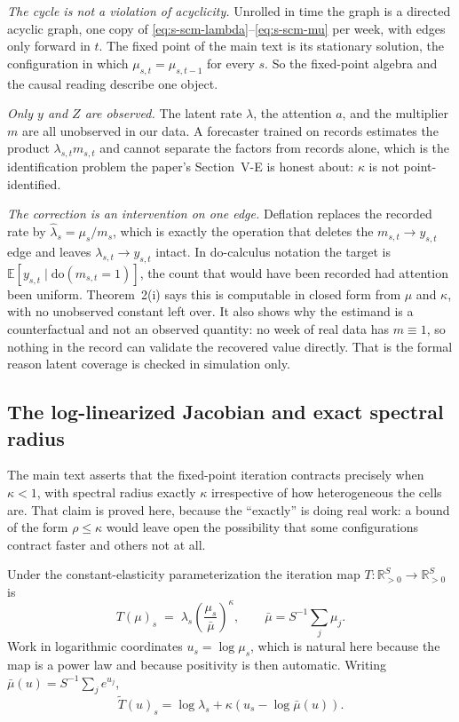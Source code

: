 \documentclass[journal,10pt,onecolumn]{IEEEtran}
\begin{document}
\emph{The cycle is not a violation of acyclicity.} Unrolled in time the graph is a
directed acyclic graph, one copy of \eqref{eq:s-scm-lambda}--\eqref{eq:s-scm-mu}
per week, with edges only forward in $t$. The fixed point of the main text is its
stationary solution, the configuration in which $\mu_{s,t} = \mu_{s,t-1}$ for
every $s$. So the fixed-point algebra and the causal reading describe one object.

\emph{Only $y$ and $Z$ are observed.} The latent rate $\lambda$, the attention
$a$, and the multiplier $m$ are all unobserved in our data. A forecaster trained
on records estimates the product $\lambda_{s,t} m_{s,t}$ and cannot separate the
factors from records alone, which is the identification problem the paper's
Section~V-E is honest about: $\kappa$ is not point-identified.

\emph{The correction is an intervention on one edge.} Deflation replaces the
recorded rate by $\hat{\lambda}_s = \mu_s / m_s$, which is exactly the operation
that deletes the $m_{s,t} \rightarrow y_{s,t}$ edge and leaves
$\lambda_{s,t} \rightarrow y_{s,t}$ intact. In do-calculus notation the target is
$\mathbb{E}[y_{s,t} \mid \mathrm{do}(m_{s,t} = 1)]$, the count that would have been
recorded had attention been uniform. Theorem~2(i) says this is computable in closed
form from $\mu$ and $\kappa$, with no unobserved constant left over. It also shows
why the estimand is a counterfactual and not an observed quantity: no week of real
data has $m \equiv 1$, so nothing in the record can validate the recovered value
directly. That is the formal reason latent coverage is checked in simulation only.

\subsection{The log-linearized Jacobian and exact spectral radius}
\label{sec:s1-jacobian}

The main text asserts that the fixed-point iteration contracts precisely when
$\kappa < 1$, with spectral radius exactly $\kappa$ irrespective of how
heterogeneous the cells are. That claim is proved here, because the ``exactly''
is doing real work: a bound of the form $\rho \le \kappa$ would leave open the
possibility that some configurations contract faster and others not at all.

Under the constant-elasticity parameterization the iteration map
$T : \mathbb{R}^S_{>0} \to \mathbb{R}^S_{>0}$ is
\begin{equation}
\label{eq:s-map}
T(\mu)_s \;=\; \lambda_s \left(\frac{\mu_s}{\bar{\mu}}\right)^{\!\kappa},
\qquad \bar{\mu} = S^{-1}\textstyle\sum_j \mu_j .
\end{equation}
Work in logarithmic coordinates $u_s = \log \mu_s$, which is natural here because
the map is a power law and because positivity is then automatic. Writing
$\bar{\mu}(u) = S^{-1}\sum_j e^{u_j}$,
\begin{equation}
\label{eq:s-logmap}
\widetilde{T}(u)_s = \log \lambda_s + \kappa\left(u_s - \log \bar{\mu}(u)\right).
\end{equation}
\end{document}
